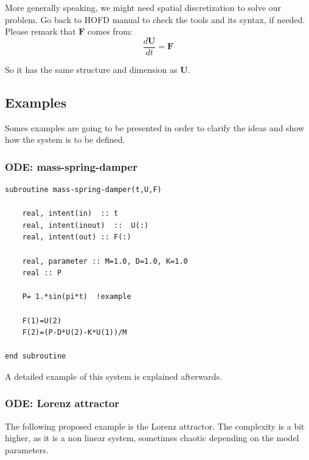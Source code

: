 More generally speaking, we might need spatial discretization to solve our
problem. Go back to HOFD manual to check the tools and its syntax, if needed. \\

Please remark that $\mathbf{F}$ comes from: 
$$
\frac{d \mathbf{U}}{dt}= \mathbf{F}
$$

So it has the same structure and dimension as $\mathbf{U}$.\\

\subsection*{Examples}

Somes examples are going to be presented in order to clarify the ideas and show
how the system is to be defined.

\subsubsection*{ODE: mass-spring-damper}

\begin{blueframed}
\begin{lstlisting}
subroutine mass-spring-damper(t,U,F)

	real, intent(in)  :: t
	real, intent(inout)  ::  U(:)
	real, intent(out) :: F(:)
	
	real, parameter :: M=1.0, D=1.0, K=1.0
	real :: P
	
	P= 1.*sin(pi*t)  !example
	
	F(1)=U(2)
	F(2)=(P-D*U(2)-K*U(1))/M	
	
end subroutine
\end{lstlisting}
\end{blueframed}

A detailed example of this system is explained afterwards.\\

\subsubsection*{ODE: Lorenz attractor}

The following proposed example is the Lorenz attractor. The complexity is a
bit higher, as it is a non linear system, sometimes chaotic depending on the
model parameters.

